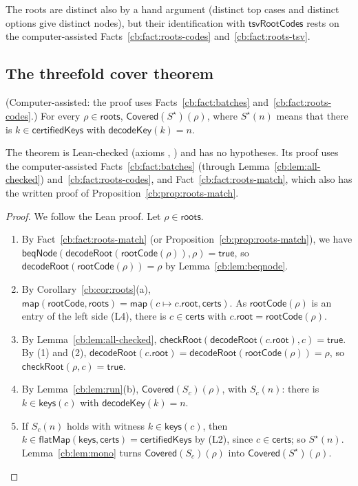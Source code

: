 The roots are distinct also by a hand argument (distinct top cases and distinct options give distinct nodes), but their
identification with $\mathsf{tsvRootCodes}$ rests on the computer-assisted Facts~\ref{cb:fact:roots-codes}
and~\ref{cb:fact:roots-tsv}.

\subsection{The threefold cover theorem}\label{cb:sec:c3}

\begin{theorem}\label{cb:thm:c3}
(Computer-assisted: the proof uses Facts~\ref{cb:fact:batches} and~\ref{cb:fact:roots-codes}.) For every
$\rho\in\mathsf{roots}$, $\mathsf{Covered}(S^\star)(\rho)$, where $S^\star(n)$ means that there is
$k\in\mathsf{certifiedKeys}$ with $\mathsf{decodeKey}(k)=n$.
\end{theorem}

The theorem is Lean-checked (axioms , ) and has no hypotheses. Its proof uses the
computer-assisted Facts~\ref{cb:fact:batches} (through Lemma~\ref{cb:lem:all-checked}) and~\ref{cb:fact:roots-codes},
and Fact~\ref{cb:fact:roots-match}, which also has the written proof of Proposition~\ref{cb:prop:roots-match}.

\begin{proof}
We follow the Lean proof. Let $\rho\in\mathsf{roots}$.
\begin{enumerate}[label=(\arabic*)]
\item By Fact~\ref{cb:fact:roots-match} (or Proposition~\ref{cb:prop:roots-match}), we have
  $\mathsf{beqNode}(\mathsf{decodeRoot}(\mathsf{rootCode}(\rho)),\rho)=\mathsf{true}$, so
  $\mathsf{decodeRoot}(\mathsf{rootCode}(\rho))=\rho$ by Lemma~\ref{cb:lem:beqnode}.
\item By Corollary~\ref{cb:cor:roots}(a), $\mathsf{map}(\mathsf{rootCode},\mathsf{roots})=\mathsf{map}(c\mapsto
  c.\mathsf{root},\mathsf{certs})$. As $\mathsf{rootCode}(\rho)$ is an entry of the left side (L4), there is
  $c\in\mathsf{certs}$ with $c.\mathsf{root}=\mathsf{rootCode}(\rho)$.
\item By Lemma~\ref{cb:lem:all-checked}, $\mathsf{checkRoot}(\mathsf{decodeRoot}(c.\mathsf{root}),c)=\mathsf{true}$.
  By (1) and (2), $\mathsf{decodeRoot}(c.\mathsf{root})=\mathsf{decodeRoot}(\mathsf{rootCode}(\rho))=\rho$, so
  $\mathsf{checkRoot}(\rho,c)=\mathsf{true}$.
\item By Lemma~\ref{cb:lem:run}(b), $\mathsf{Covered}(S_c)(\rho)$, with $S_c(n)$: there is $k\in\mathsf{keys}(c)$ with
  $\mathsf{decodeKey}(k)=n$.
\item If $S_c(n)$ holds with witness $k\in\mathsf{keys}(c)$, then $k\in\mathsf{flatMap}(\mathsf{keys},\mathsf{certs})=
  \mathsf{certifiedKeys}$ by (L2), since $c\in\mathsf{certs}$; so $S^\star(n)$. Lemma~\ref{cb:lem:mono} turns
  $\mathsf{Covered}(S_c)(\rho)$ into $\mathsf{Covered}(S^\star)(\rho)$.\qedhere
\end{enumerate}
\end{proof}

